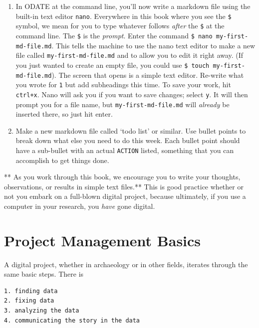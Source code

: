 \documentclass[english,]{book}
\begin{document}
\begin{enumerate}
\def\labelenumi{\arabic{enumi}.}
\setcounter{enumi}{1}
\item
  In ODATE at the command line, you'll now write a markdown file using
  the built-in text editor \texttt{nano}. Everywhere in this book where
  you see the \texttt{\$} symbol, we mean for you to type whatever
  follows \emph{after} the \texttt{\$} at the command line. The
  \texttt{\$} is the \emph{prompt}. Enter the command
  \texttt{\$\ nano\ my-first-md-file.md}. This tells the machine to use
  the nano text editor to make a new file called
  \texttt{my-first-md-file.md} and to allow you to edit it right away.
  (If you just wanted to create an empty file, you could use
  \texttt{\$\ touch\ my-first-md-file.md}). The screen that opens is a
  simple text editor. Re-write what you wrote for \texttt{1} but add
  subheadings this time. To save your work, hit \texttt{ctrl+x}. Nano
  will ask you if you want to save changes; select \texttt{y}. It will
  then prompt you for a file name, but \texttt{my-first-md-file.md} will
  \emph{already} be inserted there, so just hit enter.
\item
  Make a new markdown file called `todo list' or similar. Use bullet
  points to break down what else you need to do this week. Each bullet
  point should have a sub-bullet with an actual \texttt{ACTION} listed,
  something that you can accomplish to get things done.
\end{enumerate}

** As you work through this book, we encourage you to write your
thoughts, observations, or results in simple text files.** This is good
practice whether or not you embark on a full-blown digital project,
because ultimately, if you use a computer in your research, you
\emph{have} gone digital.

\hypertarget{project-management-basics}{\section{Project Management
Basics}\label{project-management-basics}}

A digital project, whether in archaeology or in other fields, iterates
through the same basic steps. There is

\begin{verbatim}
1. finding data
2. fixing data
3. analyzing the data
4. communicating the story in the data
\end{verbatim}
\end{document}
